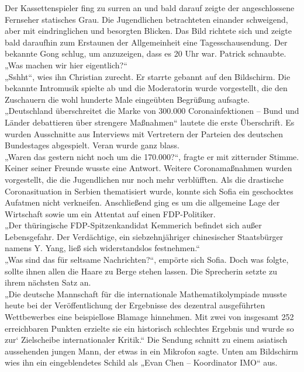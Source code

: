 \documentclass[oneside]{memoir}
\begin{document}
Der Kassettenspieler fing zu surren an und bald darauf zeigte der angeschlossene Fernseher statisches Grau. Die Jugendlichen betrachteten einander schweigend, aber mit eindringlichen und besorgten Blicken. Das Bild richtete sich und zeigte bald daraufhin zum Erstaunen der Allgemeinheit eine Tagesschausendung. Der bekannte Gong schlug, um anzuzeigen, dass es 20 Uhr war. Patrick schnaubte.
„Was machen wir hier eigentlich?“ \\
„Sshht“, wies ihn Christian zurecht. Er starrte gebannt auf den Bildschirm. Die bekannte Intromusik spielte ab und die Moderatorin wurde vorgestellt, die den Zuschauern die wohl hunderte Male eingeübten Begrüßung aufsagte. \\
„Deutschland überschreitet die Marke von 300.000 Coronainfektionen – Bund und Länder debattieren über strengere Maßnahmen“ lautete die erste Überschrift. Es wurden Ausschnitte aus Interviews mit Vertretern der Parteien des deutschen Bundestages abgespielt. Veran wurde ganz blass. \\
„Waren das gestern nicht noch um die 170.000?“, fragte er mit zitternder Stimme. Keiner seiner Freunde wusste eine Antwort. Weitere Coronamaßnahmen wurden vorgestellt, die die Jugendlichen nur noch mehr verblüfften. Als die drastische Coronasituation in Serbien thematisiert wurde, konnte sich Sofia ein geschocktes Aufatmen nicht verkneifen. Anschließend ging es um die allgemeine Lage der Wirtschaft sowie um ein Attentat auf einen FDP-Politiker. \\
„Der thüringische FDP-Spitzenkandidat Kemmerich befindet sich außer Lebensgefahr. Der Verdächtige, ein siebzehnjähriger chinesischer Staatsbürger namens Y. Yang, ließ sich widerstandslos festnehmen.“ \\
„Was sind das für seltsame Nachrichten?“, empörte sich Sofia. Doch was folgte, sollte ihnen allen die Haare zu Berge stehen lassen. Die Sprecherin setzte zu ihrem nächsten Satz an. \\
„Die deutsche Mannschaft für die internationale Mathematikolympiade musste heute bei der Veröffentlichung der Ergebnisse des dezentral ausgeführten Wettbewerbes eine beispiellose Blamage hinnehmen. Mit zwei von insgesamt 252 erreichbaren Punkten erzielte sie ein historisch schlechtes Ergebnis und wurde so zur` Zielscheibe internationaler Kritik.“
Die Sendung schnitt zu einem asiatisch aussehenden jungen Mann, der etwas in ein Mikrofon sagte. Unten am Bildschirm wies ihn ein eingeblendetes Schild als „Evan Chen – Koordinator IMO“ aus. \\
\end{document}
